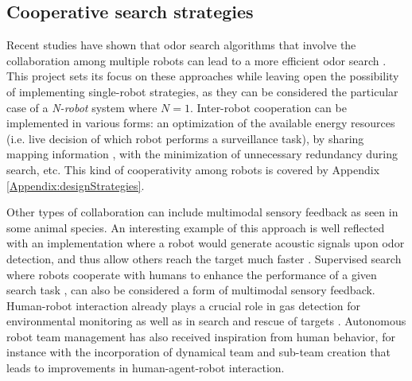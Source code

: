 \subsection{Cooperative search strategies}

\vspace{-0.3cm}

Recent studies have shown that odor search algorithms that involve the collaboration among multiple robots can lead to a more efficient odor search \cite{Hu2013, Mcgill2011, marjovi2010olfactory}.
This project sets its focus on these approaches while leaving open the possibility of implementing single-robot strategies, as they can be considered the particular case of a \emph{N-robot} system where $N=1$.
Inter-robot cooperation can be implemented in various forms: an optimization of the available energy resources (i.e. live decision of which robot performs a surveillance task), by sharing mapping information \cite{Marjovi2011}, with the minimization of unnecessary redundancy during search, etc.
This kind of cooperativity among robots is covered by Appendix \ref{Appendix:designStrategies}.

Other types of collaboration can include multimodal sensory feedback as seen in some animal species. An interesting example of this approach is well reflected with an implementation where a robot would generate acoustic signals upon odor detection, and thus allow others reach the target much faster \cite{song2011olfaction}.
Supervised search where robots cooperate with humans to enhance the performance of a given search task \cite{GoodrichPendleton11, KonoligeOrtiz04}, can also be considered a form of multimodal sensory feedback.
Human-robot interaction already plays a crucial role in gas detection for environmental monitoring \cite{Dunbabin2012} as well as in search and rescue of targets \cite{Hu2013}.
Autonomous robot team management has also received inspiration from human behavior, for instance with the incorporation of dynamical team and sub-team creation \cite{BradshawFeltovich09} that leads to improvements in human-agent-robot interaction.




